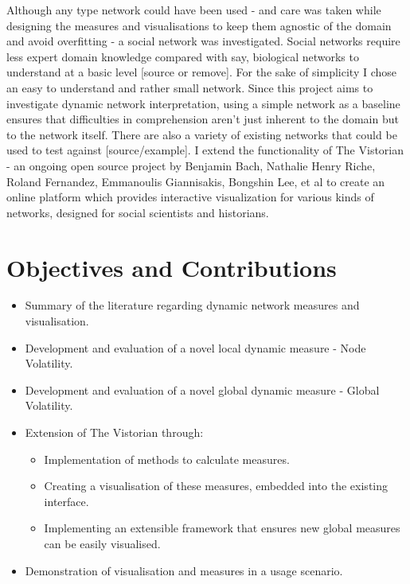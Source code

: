 Although any type network could have been used - and care was taken while designing the measures and visualisations to keep them agnostic of the domain and avoid overfitting - a social network was investigated. Social networks require less expert domain knowledge compared with say, biological networks to understand at a basic level [source or remove]. For the sake of simplicity I chose an easy to understand and rather small network.  Since this project aims to investigate dynamic network interpretation, using a simple network as a baseline ensures that difficulties in comprehension aren’t just inherent to the domain but to the network itself. There are also a variety of existing networks that could be used to test against [source/example].
I extend the functionality of The Vistorian \cite{bach:hal-01205822} - an ongoing open source project by Benjamin Bach, Nathalie Henry Riche, Roland Fernandez, Emmanoulis Giannisakis, Bongshin Lee, et al to create an online platform which provides interactive visualization for various kinds of networks, designed for social scientists and historians. 



\section{Objectives and Contributions}
\label{objectives}
\begin{itemize}
    \item Summary of the literature regarding dynamic network measures and visualisation.
    \item Development and evaluation of a novel local dynamic measure - Node Volatility.
    \item Development and evaluation of a novel global dynamic measure - Global Volatility.
    \item Extension of The Vistorian through:
    \begin{itemize}
        \item Implementation of methods to calculate measures.
        \item Creating a visualisation of these measures, embedded into the existing interface.
        \item Implementing an extensible framework that ensures new global measures can be easily visualised.
    \end{itemize}
    \item Demonstration of visualisation and measures in a usage scenario.


\end{itemize}





